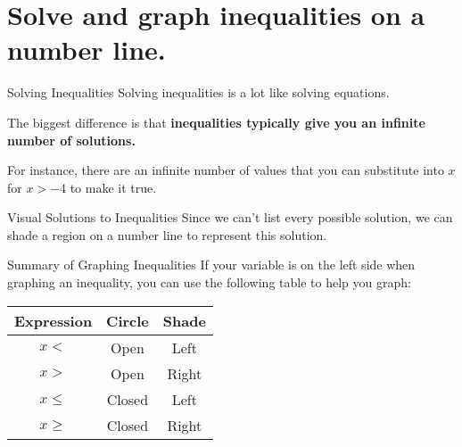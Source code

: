 \documentclass[t]{beamer}
\begin{document}
\section{Solve and graph inequalities on a number line.}


\begin{frame}{Solving Inequalities}
Solving inequalities is a lot like solving equations.	\newline\\	\pause

The biggest difference is that {\color{blue}\textbf{inequalities typically give you an infinite number of solutions.}}	\newline\\	\pause

For instance, there are an infinite number of values that you can substitute into $x$ for $x > -4$ to make it true.
\end{frame}

\begin{frame}{Visual Solutions to Inequalities}
Since we can't list every possible solution, we can shade a region on a number line to represent this solution.	\newline\\	\pause
\begin{center}
\end{center}
\end{frame}

\begin{frame}{Summary of Graphing Inequalities}
If your variable is on the \alert{left side} when graphing an inequality, you can use the following table to help you graph:	\newline\\
\begin{center}
\setlength{\extrarowheight}{4pt}
\begin{tabular}{c|c|c}  
\textbf{Expression}	&	\textbf{Circle}	&	\textbf{Shade}	\\
\hline
$x<$					&	Open				& 	Left		\\[4pt]
\hline
$x>$					&	Open				&	Right	\\[4pt]
\hline
$x \leq$				&	Closed			&	Left		\\[4pt]
\hline
$x \geq$				&	Closed			&	Right	\\[4pt]
\end{tabular}
\end{center}
\end{frame}
\end{document}
